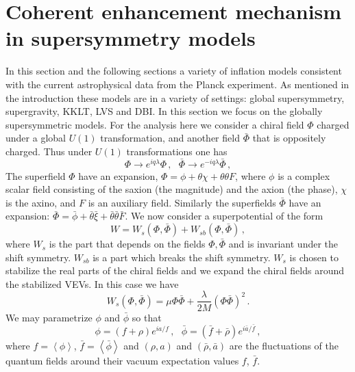 \documentclass[12pt]{article}
\begin{document}
\section{Coherent enhancement mechanism in supersymmetry models \label{sec:Supersymmetry}}
In this section and the following sections a variety of inflation models consistent with the current astrophysical data from the Planck experiment.
As mentioned in the introduction these models are in a variety of settings: global supersymmetry, supergravity, KKLT, LVS and DBI.
In this section we focus on the globally supersymmetric models.
For the analysis here we consider a chiral field $\Phi$ charged under a global $U\left(1\right)$ transformation, and another field $\bar\Phi$ that is oppositely charged.
Thus under $U\left(1\right)$ transformations one has
\begin{equation}
  \Phi \to e^{i q \lambda} \Phi\,,
  ~~~ \bar\Phi \to e^{-i q \lambda} \bar\Phi\,,
\end{equation}
The superfield $\Phi$ have an expansion, $\Phi = \phi + \theta \chi + \theta \theta F$, where $\phi$ is a complex scalar field consisting of the saxion (the magnitude) and the axion (the phase), $\chi$ is the axino, and $F$ is an auxiliary field.
Similarly the superfields $\bar\Phi$ have an expansion: $\bar\Phi = \bar\phi + \bar\theta \bar\xi + \bar\theta \bar\theta \bar F$.
We now consider a superpotential of the form
\begin{equation} \label{eq:supersymmetry:W}
  W = W_s\left(\Phi, \bar\Phi\right) + W_{sb}\left(\Phi, \bar\Phi\right)\,,
\end{equation}
where $W_s$ is the part that depends on the fields $\Phi, \bar\Phi$ and is invariant under the shift symmetry.
$W_{sb}$ is a part which breaks the shift symmetry.
$W_s$ is chosen to stabilize the real parts of the chiral fields and we expand the chiral fields around the stabilized VEVs.
In this case we have
\begin{equation}
  W_s\left(\Phi, \bar\Phi\right) = \mu \Phi \bar\Phi + \frac{\lambda}{2 M} \left(\Phi \bar\Phi\right)^2\,.
\end{equation}
We may parametrize $\phi$ and $\bar\phi$ so that
\begin{equation}
  \phi = \left(f + \rho\right) e^{i a / f}\,,
  ~~~ \bar\phi = \left(\bar f + \bar\rho\right) e^{i \bar a / \bar f}\,,
\end{equation}
where $f = \left<\phi\right>$, $\bar f = \left<\bar\phi\right>$ and $\left(\rho, a\right)$ and $\left(\bar\rho, \bar a\right)$ are the fluctuations of the quantum fields around their vacuum expectation values $f$, $\bar f$.
\end{document}
